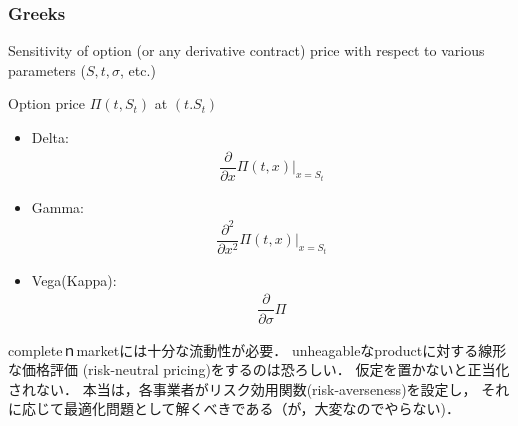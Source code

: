 \documentclass[a4paper,11pt]{jsarticle}
\theoremstyle{definition}
\newcommand{\pd}[2]{\dfrac{\partial #1}{\partial #2}}
\newcommand{\pdd}[2]{\dfrac{{\partial}^2 #1} {\partial {#2}^2} }
\begin{document}
\subsubsection{Greeks}
Sensitivity of option (or any derivative contract) price
with respect to various parameters ($S,t,\sigma$, etc.)

Option price $\Pi(t,S_t)$ at $(t.S_t)$

\begin{itemize}
  \item Delta:
  \begin{align}
    \pd{}{x}\Pi(t,x)|_{x=S_t}
  \end{align}
  \item Gamma:
  \begin{align}
    \pdd{}{x} \Pi(t,x)|_{x=S_t}
  \end{align}
  \item Vega(Kappa):
  \begin{align}
    \pd{}{\sigma} \Pi
  \end{align}
\end{itemize}

completeｎmarketには十分な流動性が必要．
unheagableなproductに対する線形な価格評価
(risk-neutral pricing)をするのは恐ろしい．
仮定を置かないと正当化されない．
本当は，各事業者がリスク効用関数(risk-averseness)を設定し，
それに応じて最適化問題として解くべきである（が，大変なのでやらない)．
\end{document}
